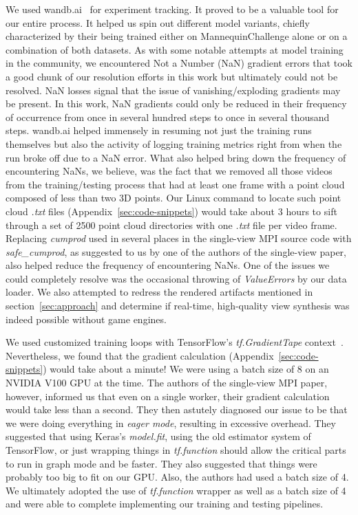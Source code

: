 We used wandb.ai~\cite{wandb} for experiment tracking. It proved to be a valuable tool for our entire process. It helped us spin out different model variants, chiefly characterized by their being trained either on MannequinChallenge alone or on a combination of both datasets. As with some notable attempts at model training in the community, we encountered Not a Number (NaN) gradient errors that took a good chunk of our resolution efforts in this work but ultimately could not be resolved. NaN losses signal that the issue of vanishing/exploding gradients may be present. In this work, NaN gradients could only be reduced in their frequency of occurrence from once in several hundred steps to once in several thousand steps. wandb.ai helped immensely in resuming not just the training runs themselves but also the activity of logging training metrics right from when the run broke off due to a NaN error. What also helped bring down the frequency of encountering NaNs, we believe, was the fact that we removed all those videos from the training/testing process that had at least one frame with a point cloud composed of less than two 3D points. Our Linux command to locate such point cloud \textit{.txt} files (Appendix~\ref{sec:code-snippets}) would take about 3 hours to sift through a set of 2500 point cloud directories with one \textit{.txt} file per video frame. Replacing \textit{cumprod} used in several places in the single-view MPI source code with \textit{safe\_cumprod}, as suggested to us by one of the authors of the single-view paper, also helped reduce the frequency of encountering NaNs. One of the issues we could completely resolve was the occasional throwing of \textit{ValueErrors} by our data loader. We also attempted to redress the rendered artifacts mentioned in section~\ref{sec:approach} and determine if real-time, high-quality view synthesis was indeed possible without game engines.

We used customized training loops with TensorFlow's \textit{tf.GradientTape} context~\cite{noauthor_custom_nodate}. Nevertheless, we found that the gradient calculation (Appendix~\ref{sec:code-snippets}) would take about a minute! We were using a batch size of 8 on an NVIDIA V100 GPU at the time. The authors of the single-view MPI paper, however, informed us that even on a single worker, their gradient calculation would take less than a second. They then astutely diagnosed our issue to be that we were doing everything in \textit{eager mode}, resulting in excessive overhead. They suggested that using Keras's \textit{model.fit}, using the old estimator system of TensorFlow, or just wrapping things in \textit{tf.function} should allow the critical parts to run in graph mode and be faster. They also suggested that things were probably too big to fit on our GPU. Also, the authors had used a batch size of 4. We ultimately adopted the use of \textit{tf.function} wrapper as well as a batch size of 4 and were able to complete implementing our training and testing pipelines.

